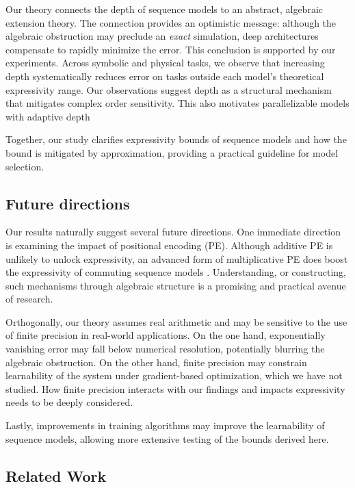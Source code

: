 \documentclass{article}
\theoremstyle{plain}
\theoremstyle{definition}
\theoremstyle{remark}
\begin{document}
Our theory connects the depth of sequence models to an abstract, algebraic extension theory.
The connection provides an optimistic message: although the algebraic obstruction may preclude an \emph{exact} simulation, deep architectures compensate to rapidly minimize the error.  This conclusion is supported by our experiments.  Across symbolic and physical tasks, we observe that increasing depth systematically reduces error on tasks outside each model's theoretical expressivity range.  Our observations suggest depth as a structural mechanism that mitigates complex order sensitivity.
This also motivates parallelizable models with adaptive depth \citep{dehghani2018universal,csordas2021devil,csordas2021ndr,csordas2024moeut,tan2023sparse}

Together, our study clarifies expressivity bounds of sequence models and how the bound is mitigated by approximation, providing a practical guideline for model selection.

\subsection{Future directions}
Our results naturally suggest several future directions.
One immediate direction is examining the impact of positional encoding (PE).
Although additive PE is unlikely to unlock expressivity,
an advanced form of multiplicative PE does boost the expressivity of commuting sequence models \cite{liu2022transformers,yang2025path}.
Understanding, or constructing, such mechanisms through algebraic structure
is a promising and practical avenue of research.

Orthogonally, our theory assumes real arithmetic and may be sensitive to the use of finite precision in real-world applications.  On the one hand, exponentially vanishing error may fall below numerical resolution, potentially blurring the algebraic obstruction. On the other hand, finite precision may constrain learnability of the system under gradient-based optimization, which we have not studied. How finite precision interacts with our findings and impacts expressivity needs to be deeply considered.

Lastly, improvements in training algorithms may improve the learnability of sequence models, allowing more extensive testing of the bounds derived here.

\subsection{Related Work}
\end{document}
